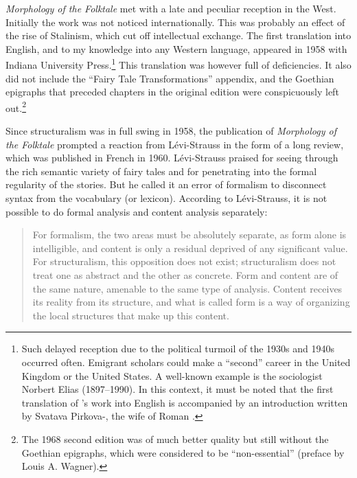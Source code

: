 \documentclass[output=paper]{langscibook}
\begin{document}
\emph{Morphology of the Folktale} met with a late and peculiar reception in the West. Initially the work was not noticed internationally. This was probably an effect of the rise of Stalinism, which cut off intellectual exchange. The first translation into English, and to my knowledge into any Western language, appeared in 1958 with Indiana University Press.\footnote{Such delayed reception due to the political turmoil of the 1930s and 1940s occurred often. Emigrant scholars could make a ``second'' career in the United Kingdom or the United States. A well-known example is the sociologist Norbert Elias (1897--1990). In this context, it must be noted that the first translation of {\Propp}'s work into English is accompanied by an introduction written by Svatava Pirkova-{\Jakobson}, the wife of Roman {\Jakobson}.} This translation was however full of deficiencies. It also did not include the ``Fairy Tale Transformations'' appendix, and the Goethian epigraphs that preceded chapters in the original edition were conspicuously left out.\footnote{The 1968 second edition was of much better quality but still without the Goethian epigraphs, which were considered to be ``non-essential'' (preface by Louis A. Wagner).} 

Since structuralism was in full swing in 1958, the publication of \emph{Morphology of the Folktale} prompted a reaction from Lévi-Strauss in the form of a long review, which was published in French in 1960. Lévi-Strauss praised {\Propp} for seeing through the rich semantic variety of fairy tales and for penetrating into the formal regularity of the stories. But he called it an error of formalism to disconnect syntax from the vocabulary (or lexicon). According to Lévi-Strauss, it is not possible to do formal analysis and content analysis separately: 

\begin{quotation}
For formalism, the two areas must be absolutely separate, as form alone is intelligible, and content is only a residual deprived of any significant value. For structuralism, this opposition does not exist; structuralism does not treat one as abstract and the other as concrete. Form and content are of the same nature, amenable to the same type of analysis. Content receives its reality from its structure, and what is called form is a way of organizing the local structures that make up this content. \citep[179]{Levi-Strauss1984}
\end{quotation}
\end{document}
